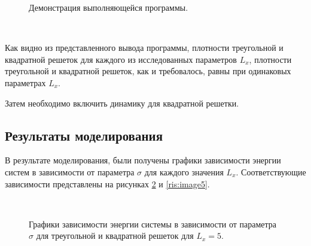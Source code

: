 \documentclass[14pt,a4paper,report]{ncc}
\begin{document}
\begin{figure}[]
\caption{Демонстрация выполняющейся программы.}
\label{ris:image3}
\end{figure}
\

Как видно из представленного вывода программы, плотности треугольной и квадратной решеток для каждого из исследованных параметров $L_x$, плотности треугольной и квадратной решеток, как и требовалось, равны при одинаковых параметрах $L_x$.
\

Затем необходимо включить динамику для квадратной решетки. 

 \subsection{Результаты моделирования}
В результате моделирования, были получены графики зависимости энергии систем в зависимости от параметра $\sigma$ для каждого значения $L_x$. Соответствующие зависимости представлены на рисунках \ref{ris:image4} и \ref{ris:image5}.


 \
 
 \begin{figure}[]
\caption{Графики зависимости энергии системы в зависимости от параметра $\sigma$ для треугольной и квадратной решеток для $L_x=5$.}
\label{ris:image4}
\end{figure}
\
\end{document}

